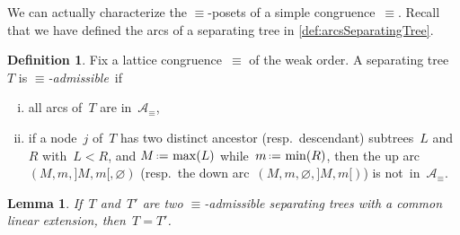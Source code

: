 \documentclass{amsart}
\newtheorem{lemma}[theorem]{Lemma}
\theoremstyle{definition}
\newtheorem{definition}[theorem]{Definition}
\newcommand{\eqdef}{\mbox{\,\raisebox{0.2ex}{\scriptsize\ensuremath{\mathrm:}}\ensuremath{=}\,}} %
\newcommand{\darkblue}{\color{darkblue}} %
\newcommand{\defn}[1]{\textsl{\darkblue #1}} %
\newcommand{\arcs}{{\mathcal{A}}} %
\begin{document}
We can actually characterize the $\equiv$-posets of a simple congruence~$\equiv$.
Recall that we have defined the arcs of a separating tree in \cref{def:arcsSeparatingTree}.

%

\begin{definition}
\label{def:admissibleSeparatingTrees}
Fix a lattice congruence~$\equiv$ of the weak order.
A separating tree~$T$ is \defn{$\equiv$-admissible}~if
\begin{enumerate}[(i)]
\item all arcs of~$T$ are in~$\arcs_\equiv$,
\item if a node~$j$ of~$T$ has two distinct ancestor (resp.~descendant) subtrees~$L$ and~$R$ with~$L < R$, and $M \eqdef \max(L)$ while~$m \eqdef \min(R)$, then the up arc~$(M, m, {]M,m[}, \varnothing)$ (resp.~the down arc~$(M, m, \varnothing, {]M,m[})$) is not~in~$\arcs_\equiv$.
\end{enumerate}
\end{definition}

\begin{lemma}
\label{lem:admissibleSeparatingTreesWithCommonLinearExtensions}
If~$T$ and~$T'$ are two $\equiv$-admissible separating trees with a common linear extension, then~${T = T'}$.
\end{lemma}
\end{document}

